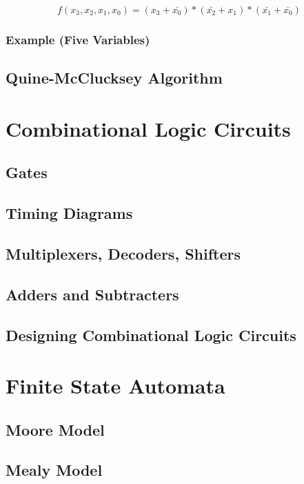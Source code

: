 \documentclass[11pt]{article}
\begin{document}
\vspace{-1cm}

\[ f(x_3,x_2,x_1,x_0) = (x_3 + \bar{x_0}) * (\bar{x_2} + x_1) * (\bar{x_1} + \bar{x_0}) \]

\subsubsection{Example (Five Variables)}

\subsection{Quine-McClucksey Algorithm}

\section{Combinational Logic Circuits}

\subsection{Gates}

\subsection{Timing Diagrams}

\subsection{Multiplexers, Decoders, Shifters}

\subsection{Adders and Subtracters}

\subsection{Designing Combinational Logic Circuits}

\section{Finite State Automata}

\subsection{Moore Model}

\subsection{Mealy Model}
\end{document}
